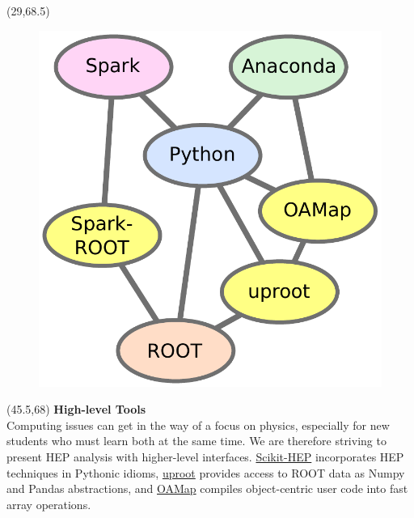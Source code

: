 \documentclass[final]{beamer}
\begin{document}
\begin{frame}{}
\begin{textblock}{12.5}(29,68.5)
\begin{figure}[tbph]
\centering
\includegraphics[width=\textwidth]{images/new_relationship.pdf}
\end{figure}
\end{textblock}


\begin{textblock}{23}(45.5,68)
\textcolor{mybluelabel}{\bf High-level Tools} \\
Computing issues can get in the way of a focus on physics, especially for
new students who must learn both at the same time. We are therefore striving
to present HEP analysis with higher-level interfaces. \href{http://scikit-hep.org/}{Scikit-HEP}
incorporates HEP techniques in Pythonic idioms, \href{https://github.com/scikit-hep/uproot}{uproot}
provides access to ROOT data as Numpy and Pandas abstractions, and \href{https://github.com/diana-hep/oamap}{OAMap}
compiles object-centric user code into fast array operations.
\end{textblock}


\end{frame}
\end{document}
